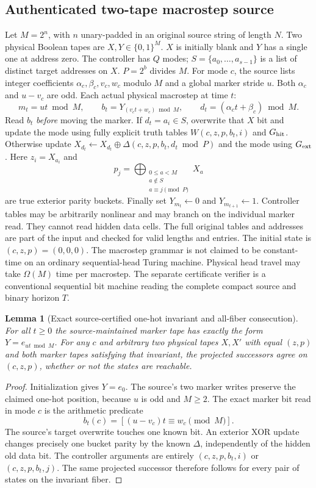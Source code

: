 \documentclass[11pt]{article}
\newtheorem{lemma}{Lemma}
\begin{document}
\subsection{Authenticated two-tape macrostep source}
Let $M=2^n$, with $n$ unary-padded in an original source string of length $N$. Two physical Boolean tapes are $X,Y\in\{0,1\}^M$. $X$ is initially blank and $Y$ has a single one at address zero. The controller has $Q$ modes; $S=\{a_0,\ldots,a_{s-1}\}$ is a list of distinct target addresses on $X$. $P=2^b$ divides $M$. For mode $c$, the source lists integer coefficients $\alpha_c,\beta_c,v_c,w_c$ modulo $M$ and a global marker stride $u$. Both $\alpha_c$ and $u-v_c$ are odd. Each actual physical macrostep at time $t$:
\[
m_t=ut\bmod M,\qquad b_t=Y_{(v_ct+w_c)\bmod M},\qquad d_t=(\alpha_ct+\beta_c)\bmod M.
\]
Read $b_t$ \emph{before} moving the marker. If $d_t=a_i\in S$, overwrite that $X$ bit and update the mode using fully explicit truth tables $W(c,z,p,b_t,i)$ and $G_{\rm hit}$. Otherwise update $X_{d_t}\leftarrow X_{d_t}\oplus\Delta(c,z,p,b_t,d_t\bmod P)$ and the mode using $G_{\rm ext}$. Here $z_i=X_{a_i}$ and
\[
p_j=\bigoplus_{\substack{0\le a<M\\a\notin S\\a\equiv j\pmod P}}X_a
\]
are true exterior parity buckets. Finally set $Y_{m_t}\leftarrow0$ and $Y_{m_{t+1}}\leftarrow1$. Controller tables may be arbitrarily nonlinear and may branch on the individual marker read. They cannot read hidden data cells. The full original tables and addresses are part of the input and checked for valid lengths and entries. The initial state is $(c,z,p)=(0,0,0)$.
The macrostep grammar is not claimed to be constant-time on an ordinary sequential-head Turing machine. Physical head travel may take $\Omega(M)$ time per macrostep. The separate certificate verifier is a conventional sequential bit machine reading the complete compact source and binary horizon $T$.

\begin{lemma}[Exact source-certified one-hot invariant and all-fiber consecution]
For all $t\ge0$ the source-maintained marker tape has exactly the form $Y=e_{ut\bmod M}$. For any $c$ and arbitrary two physical tapes $X,X'$ with equal $(z,p)$ and both marker tapes satisfying that invariant, the projected successors agree on $(c,z,p)$, whether or not the states are reachable.
\end{lemma}
\begin{proof}
Initialization gives $Y=e_0$. The source's two marker writes preserve the claimed one-hot position, because $u$ is odd and $M\ge2$. The exact marker bit read in mode $c$ is the arithmetic predicate
\[
b_t(c)=[(u-v_c)t\equiv w_c\pmod M].
\]
The source's target overwrite touches one known bit. An exterior XOR update changes precisely one bucket parity by the known $\Delta$, independently of the hidden old data bit. The controller arguments are entirely $(c,z,p,b_t,i)$ or $(c,z,p,b_t,j)$. The same projected successor therefore follows for every pair of states on the invariant fiber.
\end{proof}
\end{document}
